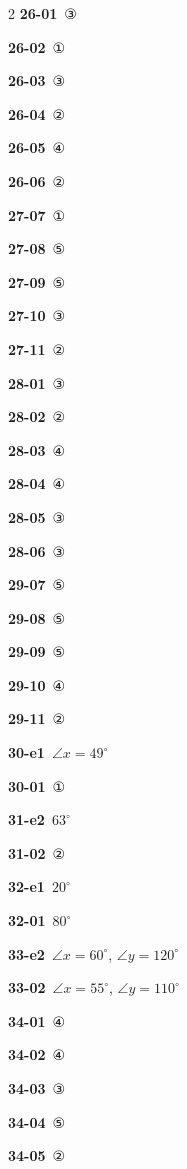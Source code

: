 \documentclass[10pt,a4paper]{article}
\begin{document}
\begin{multicols}{2}
\noindent\textbf{26-01}\ ③\par
\noindent\textbf{26-02}\ ①\par
\noindent\textbf{26-03}\ ③\par
\noindent\textbf{26-04}\ ②\par
\noindent\textbf{26-05}\ ④\par
\noindent\textbf{26-06}\ ②\par
\noindent\textbf{27-07}\ ①\par
\noindent\textbf{27-08}\ ⑤\par
\noindent\textbf{27-09}\ ⑤\par
\noindent\textbf{27-10}\ ③\par
\noindent\textbf{27-11}\ ②\par
\noindent\textbf{28-01}\ ③\par
\noindent\textbf{28-02}\ ②\par
\noindent\textbf{28-03}\ ④\par
\noindent\textbf{28-04}\ ④\par
\noindent\textbf{28-05}\ ③\par
\noindent\textbf{28-06}\ ③\par
\noindent\textbf{29-07}\ ⑤\par
\noindent\textbf{29-08}\ ⑤\par
\noindent\textbf{29-09}\ ⑤\par
\noindent\textbf{29-10}\ ④\par
\noindent\textbf{29-11}\ ②\par
\noindent\textbf{30-e1}\ $\angle x=49^\circ$\par
\noindent\textbf{30-01}\ ①\par
\noindent\textbf{31-e2}\ $63^\circ$\par
\noindent\textbf{31-02}\ ②\par
\noindent\textbf{32-e1}\ $20^\circ$\par
\noindent\textbf{32-01}\ $80^\circ$\par
\noindent\textbf{33-e2}\ $\angle x=60^\circ$, $\angle y=120^\circ$\par
\noindent\textbf{33-02}\ $\angle x=55^\circ$, $\angle y=110^\circ$\par
\noindent\textbf{34-01}\ ④\par
\noindent\textbf{34-02}\ ④\par
\noindent\textbf{34-03}\ ③\par
\noindent\textbf{34-04}\ ⑤\par
\noindent\textbf{34-05}\ ②\par

\end{multicols}
\end{document}
